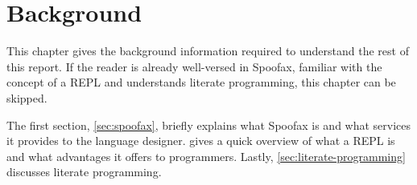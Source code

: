 \chapter{Background}
\label{cha:background}

This chapter gives the background information required to understand the rest of
this report. If the reader is already well-versed in Spoofax, familiar with the
concept of a REPL and understands literate programming, this chapter can be
skipped.

The first section, \cref{sec:spoofax}, briefly explains what Spoofax is and what
services it provides to the language designer.  gives a quick
overview of what a REPL is and what advantages it offers to programmers. Lastly,
\cref{sec:literate-programming} discusses literate programming.







